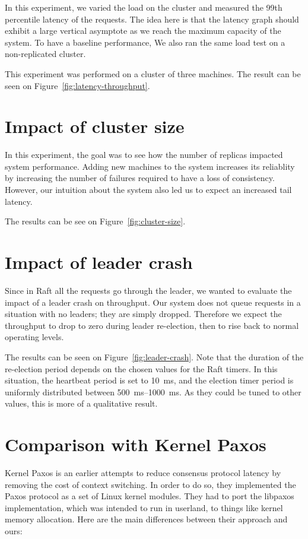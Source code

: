 In this experiment, we varied the load on the cluster and measured the 99th percentile latency of the requests.
The idea here is that the latency graph should exhibit a large vertical asymptote as we reach the maximum capacity of the system. 
To have a baseline performance, We also ran the same load test on a non-replicated cluster.

This experiment was performed on a cluster of three machines.
The result can be seen on Figure~\ref{fig:latency-throughput}.

\section{Impact of cluster size}

In this experiment, the goal was to see how the number of replicas impacted system performance.
Adding new machines to the system increases its reliablity by increasing the number of failures required to have a loss of consistency.
However, our intuition about the system also led us to expect an increased tail latency.

The results can be see on Figure~\ref{fig:cluster-size}.

\section{Impact of leader crash}

Since in Raft all the requests go through the leader, we wanted to evaluate the impact of a leader crash on throughput.
Our system does not queue requests in a situation with no leaders; they are simply dropped.
Therefore we expect the throughput to drop to zero during leader re-election, then to rise back to normal operating levels.

The results can be seen on Figure~\ref{fig:leader-crash}.
Note that the duration of the re-election period depends on the chosen values for the Raft timers.
In this situation, the heartbeat period is set to \SI{10}{\milli\second}, and the election timer period is uniformly distributed between \SIrange{500}{1000}{\milli\second}.
As they could be tuned to other values, this is more of a qualitative result.


\section{Comparison with Kernel Paxos}

Kernel Paxos\cite{kernelpaxos} is an earlier attempts to reduce consensus protocol latency by removing the cost of context switching.
In order to do so, they implemented the Paxos protocol as a set of Linux kernel modules.
They had to port the libpaxos implementation, which was intended to run in userland, to things like kernel memory allocation.
Here are the main differences between their approach and ours:

